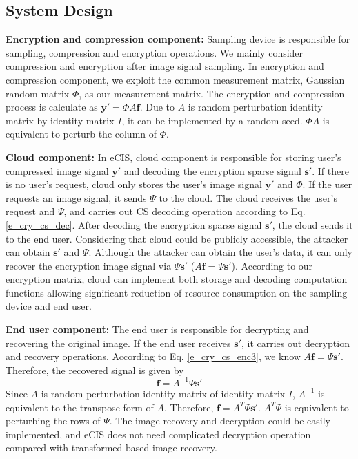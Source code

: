 \documentclass[conference]{IEEEtran}
\begin{document}
\subsection{System Design}
\textbf{Encryption and compression component:}
Sampling device is responsible for sampling, compression and encryption operations. We mainly consider compression and encryption after image signal sampling. In encryption and compression component, we exploit the common measurement matrix, Gaussian random matrix $\Phi$, as our measurement matrix. The encryption and compression process is calculate as $\mathbf{y}'=\Phi A \mathbf{f}$. Due to $A$ is random perturbation identity matrix by identity matrix $I$, it can be implemented by a random seed. $\Phi A$ is equivalent to perturb the column of $\Phi$.

\textbf{Cloud component:}
In eCIS, cloud component is responsible for storing user's compressed image signal $\mathbf{y}'$ and decoding the encryption sparse signal $\mathbf{s}'$. If there is no user's request, cloud only stores the user's image signal $\mathbf{y}'$  and $\Phi$. If the user requests an image signal, it sends $\Psi$ to the cloud. The cloud receives the user's request and $\Psi$, and carries out CS decoding operation according to Eq. \ref{e_cry_cs_dec}. After decoding the encryption sparse signal $\mathbf{s}'$, the cloud sends it to the end user. Considering that cloud could be publicly accessible, the attacker can obtain $\mathbf{s}'$ and $\Psi$. Although the attacker can obtain the user's data, it can only recover the encryption image signal via $\Psi \mathbf{s}'$ ($A\mathbf{f}=\Psi \mathbf{s}'$).
According to our encryption matrix, cloud can implement both storage and decoding computation functions allowing significant reduction of resource consumption on the sampling device and end user.

\textbf{End user component:}
The end user is responsible for decrypting and recovering the original image.  If the end user receives $\mathbf{s}'$, it carries out decryption and recovery operations. According to Eq. \ref{e_cry_cs_enc3}, we know $A\mathbf{f}=\Psi \mathbf{s}'$. Therefore, the recovered signal is given by
\begin{equation}\label{e_eusr_rec}
    \mathbf{f}=A^{-1}\Psi \mathbf{s}'
\end{equation}
Since $A$ is random perturbation identity matrix of identity matrix $I$, $A^{-1}$ is equivalent to the transpose form of $A$. Therefore, $\mathbf{f}=A^T\Psi \mathbf{s}'$. $A^T\Psi$ is equivalent to perturbing the rows of $\Psi$. The image recovery and decryption could be easily implemented, and eCIS does not need  complicated decryption operation compared with transformed-based image recovery.
\end{document}
